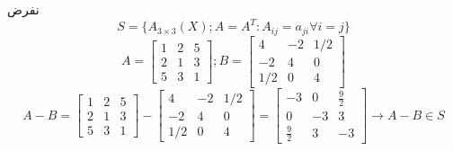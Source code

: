 \begin{example}
	نفرض
	\[
	S = \{A_{3\times 3}(X) ; A = A^T : A_{ij} = a_{ji} \forall i=j\}
	\]
	\[
	A = \begin{bmatrix}
		1 & 2 & 5 \\
		2 & 1 & 3 \\
		5 & 3 & 1
	\end{bmatrix} ; B = \begin{bmatrix}
		4 & -2 & 1/2 \\
		-2 & 4 & 0 \\
		1/2 & 0 & 4
	\end{bmatrix}\]
	\[
	A - B = \begin{bmatrix}
		1 & 2 & 5 \\
		2 & 1 & 3 \\
		5 & 3 & 1
	\end{bmatrix} - \begin{bmatrix}
		4 & -2 & 1/2 \\
		-2 & 4 & 0 \\
		1/2 & 0 & 4
	\end{bmatrix} = \begin{bmatrix}
		-3 & 0 & \frac{9}{2} \\
		0 & -3 & 3 \\
		\frac{9}{2} & 3 & -3
	\end{bmatrix} \to A - B \in S
	\]
\end{example}

